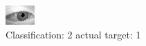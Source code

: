 \begin{figure}[h!]
\begin{center}
\includegraphics[width=0.60\columnwidth]{figures/ID2735_class_2_target_1.png}
\end{center}
\caption{ Classification: 2 actual target: 1}
\label{fig:ID2735_class_2_target_1}
\end{figure}
